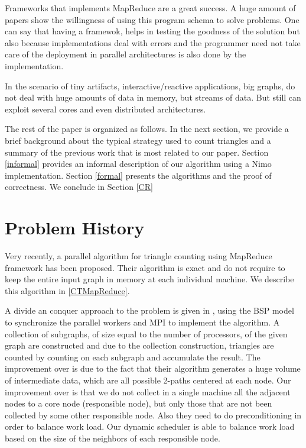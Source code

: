\documentclass{article}                     \usepackage{graphics}
\begin{document}
Frameworks that implements MapReduce are a great success. A huge amount of papers show the willingness of using this  program schema to solve problems.  One can say that having a framewok, helps in testing the goodness of the solution but also because implementations deal with errors and the programmer need not take care of the deployment in parallel architectures is also done by the implementation. 


In the scenario of tiny artifacts, interactive/reactive applications, big graphs, do not deal with  huge amounts of data in memory, but streams of data. But still  can exploit several cores and even distributed architectures.

 
  
The rest of the paper is organized as follows. In the
next section, we provide a brief background about the
typical strategy used to count triangles and a summary
of the previous work that is most related to our paper.
Section \ref{informal} provides an informal  description of our algorithm  using a Nimo implementation.
 Section \ref{formal} presents the algorithms and the proof of correctness.  
We conclude
in Section \ref{CR}



\section{Problem History}
Very recently, a parallel algorithm for triangle counting using
MapReduce framework \cite{Suri:2011:CTC:1963405.1963491} has been proposed. Their algorithm is
exact and do not require to keep the entire input graph in memory
at each individual machine. We describe this algorithm in \ref{CTMapReduce}.

A divide an conquer approach to the problem is given in \cite{Arifuzzaman:2013:PPA:2505515.2505545}, using the BSP  model to synchronize the parallel workers and MPI to implement the algorithm. A collection of subgraphs,  of size equal to the number of processors,  of the given graph are constructed and due to the collection construction, triangles are counted by counting on each subgraph and accumulate the result.  The improvement over \cite{Suri:2011:CTC:1963405.1963491} is due to the
fact that their algorithm generates a huge volume of intermediate data, which are all possible 2-paths centered at each
node. Our improvement over \cite{Arifuzzaman:2013:PPA:2505515.2505545} is that we do not collect in a single machine all the adjacent nodes to a core node (responsible node), but only those that are not been collected by some other responsible node.   Also they need to do preconditioning in order to balance work load. Our dynamic scheduler is able to  balance work load based on the size of the neighbors of each responsible node. 
\end{document}
